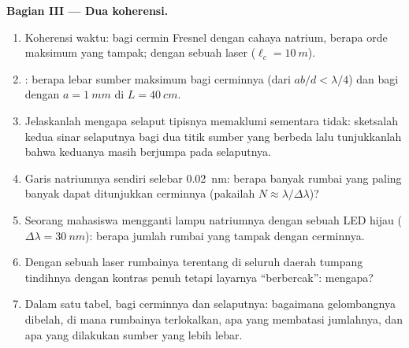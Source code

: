 \begin{problem}
\medskip
\noindent\textbf{Bagian III --- Dua koherensi.}
\begin{enumerate}[resume]
  \item Koherensi waktu: bagi cermin Fresnel dengan cahaya natrium,
        berapa orde maksimum yang tampak; dengan sebuah laser ($\ell_c = \qty{10}{m}$).
  \item {}: berapa lebar sumber maksimum bagi cerminnya
        (dari $ab/d < \lambda/4$) dan bagi  dengan $a = \qty{1}{mm}$ di
        $L = \qty{40}{cm}$.
  \item Jelaskanlah mengapa selaput tipisnya memaklumi  sementara
         tidak: sketsalah kedua sinar selaputnya bagi dua
        titik sumber yang berbeda lalu tunjukkanlah bahwa keduanya masih berjumpa pada selaputnya.
  \item Garis natriumnya sendiri selebar \qty{0.02}{nm}: berapa banyak rumbai
        yang paling banyak dapat ditunjukkan cerminnya (pakailah $N \approx \lambda/\Delta\lambda$)?
  \item Seorang mahasiswa mengganti lampu natriumnya dengan sebuah LED hijau ($\Delta\lambda =
        \qty{30}{nm}$): berapa jumlah rumbai yang tampak dengan cerminnya.
  \item Dengan sebuah laser rumbainya terentang di seluruh daerah tumpang tindihnya
        dengan kontras penuh tetapi layarnya ``berbercak'': mengapa?
  \item Dalam satu tabel, bagi cerminnya dan selaputnya: bagaimana gelombangnya
        dibelah, di mana rumbainya terlokalkan, apa yang membatasi
        jumlahnya, dan apa yang dilakukan sumber yang lebih lebar.
\end{enumerate}
\end{problem}
